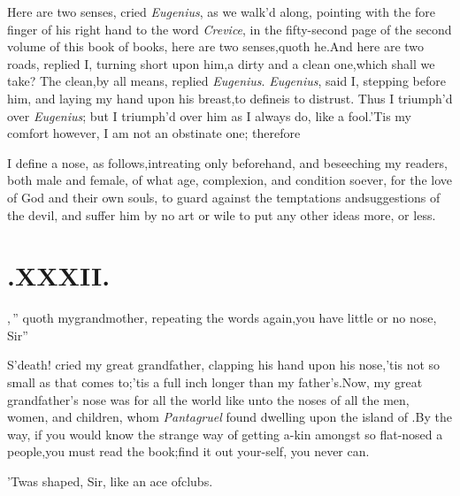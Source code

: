 \documentclass{article}
\begin{document}
\tsh Here are two senses, cried \textit{Eu\-genius}, as we walk’d
along, pointing with the fore finger of his right hand to the
word \textit{Crevice}, in the fifty-second page of the second
volume of this book of books,
\tsh here are two senses,\tsk quoth he.\tsk And here are two
roads, replied I, turning short upon him,\tsh a dirty and a
clean one,\tsh which shall we take?\tsk\break
The clean,\tsk by all means, replied \textit{Eu\-genius}.  \textit{Eugenius},
said I, stepping before him, and laying my hand upon his\break
breast,\tsh to define\tsh is to distrust.\tsh\break
Thus I triumph’d over \textit{Eugenius}; but I\break
triumph’d over him as I always do, like a fool.\tsh ’Tis my comfort however, I
am not an obstinate one; therefore

I define a nose, as follows,\tsk intreat\-ing only beforehand, and
beseeching my readers, both male and female, of what age,
complexion, and condition soever, for the love of God and their own
souls, to guard against the temptations and\break suggestions of the
devil, and suffer him by no art or wile to put any other
ideas
more, or less.

\null
\section{.\quad  XXXII.}

,\,”
quoth my\break grandmother, repeating the\break
words again,\tsk\lqq you have little or no\break
\lqq nose, Sir”\tsh

S’death! cried my great grandfather, clapping his hand
upon his nose,\tsk ’tis not so small as that comes
to;\tsk ’tis a full inch longer than my
father’s.\tsh Now, my great grandfather’s nose was
for all
the world like unto the noses of all the 
men, women, and children, whom \textit{Pan\-tagruel} found dwelling upon the
island of 
.\tsh By the way, if you would 
know the strange way of getting a-kin 
amongst so flat-nosed a people,\tsh you
must read the book;\tsk find it out your-\break self,
you never can.\tsh

\tsh ’Twas shaped, Sir, like an ace of\break clubs.
\end{document}
